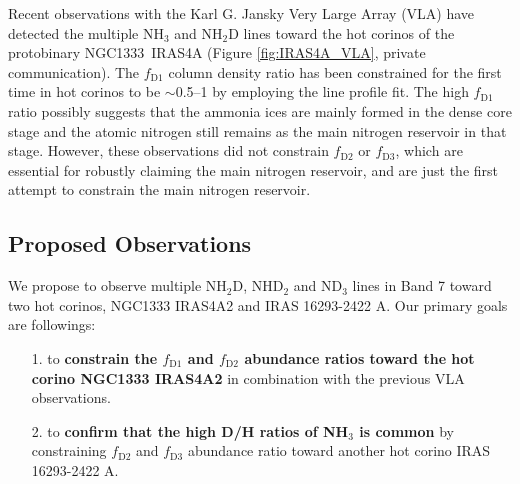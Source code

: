 \documentclass[12pt,a4paper]{article}  %
\newcommand{\ammonia}{NH$_3$\xspace}
\begin{document}
\noindent Recent observations with the Karl G. Jansky Very Large Array (VLA) have detected the multiple \ammonia and NH$_2$D lines toward the hot corinos of the protobinary NGC1333~IRAS4A (Figure \ref{fig:IRAS4A_VLA}, private communication). The $f_\mathrm{D1}$ column density ratio has been constrained for the first time in hot corinos to be $\sim$0.5--1 by employing the line profile fit. %
The high $f_\mathrm{D1}$ ratio possibly suggests that the ammonia ices are mainly formed in the dense core stage and the atomic nitrogen still remains as the main nitrogen reservoir in that stage. However, these observations did not constrain $f_\mathrm{D2}$ or $f_\mathrm{D3}$, which are essential for robustly claiming the main nitrogen reservoir, and are just the first attempt to constrain the main nitrogen reservoir. 

\subsection{Proposed Observations}
We propose to observe multiple NH$_2$D, NHD$_2$ and ND$_3$ lines in Band 7 toward two hot corinos, NGC1333 IRAS4A2 and IRAS 16293-2422 A. Our primary goals are followings:

\begin{enumerate}[leftmargin=*]
    \setlength\itemsep{-0.2em}
    
    \item[1.] to \textbf{constrain the $f_\mathrm{D1}$ and $f_\mathrm{D2}$ abundance ratios toward the hot corino NGC1333 IRAS4A2} in combination with the previous VLA observations.
    \item[2.] to \textbf{confirm that the high D/H ratios of NH$_3$ is common} by constraining $f_\mathrm{D2}$ and $f_\mathrm{D3}$ abundance ratio toward another hot corino IRAS 16293-2422 A.
\end{enumerate}


\end{document}
